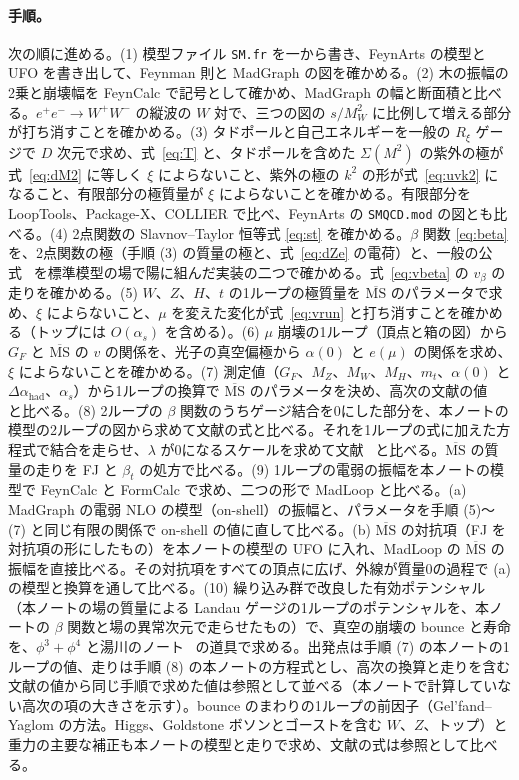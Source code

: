 \documentclass[a4paper,10pt]{ltjsarticle}
\newcommand{\MSbar}{\overline{\mathrm{MS}}}
\begin{document}
\paragraph{手順。}次の順に進める。(1) 模型ファイル \texttt{SM.fr} を一から書き、FeynArts の模型と UFO を書き出して、Feynman 則と MadGraph の図を確かめる。(2) 木の振幅の2乗と崩壊幅を FeynCalc で記号として確かめ、MadGraph の幅と断面積と比べる。$e^+e^-\to W^+W^-$ の縦波の $W$ 対で、三つの図の $s/M_W^2$ に比例して増える部分が打ち消すことを確かめる。(3) タドポールと自己エネルギーを一般の $R_\xi$ ゲージで $D$ 次元で求め、式~\eqref{eq:T} と、タドポールを含めた $\Sigma(M^2)$ の紫外の極が式~\eqref{eq:dM2} に等しく $\xi$ によらないこと、紫外の極の $k^2$ の形が式~\eqref{eq:uvk2} になること、有限部分の極質量が $\xi$ によらないことを確かめる。有限部分を LoopTools、Package-X、COLLIER で比べ、FeynArts の \texttt{SMQCD.mod} の図とも比べる。(4) 2点関数の Slavnov--Taylor 恒等式 \eqref{eq:st} を確かめる。$\beta$ 関数 \eqref{eq:beta} を、2点関数の極（手順 (3) の質量の極と、式~\eqref{eq:dZe} の電荷）と、一般の公式~\cite{mv1,mv2,mv3,luo03} を標準模型の場で陽に組んだ実装の二つで確かめる。式~\eqref{eq:vbeta} の $v_\beta$ の走りを確かめる。(5) $W$、$Z$、$H$、$t$ の1ループの極質量を $\MSbar$ のパラメータで求め、$\xi$ によらないこと、$\mu$ を変えた変化が式~\eqref{eq:vrun} と打ち消すことを確かめる（トップには $O(\alpha_s)$ を含める）。(6) $\mu$ 崩壊の1ループ（頂点と箱の図）から $G_F$ と $\MSbar$ の $v$ の関係を、光子の真空偏極から $\alpha(0)$ と $e(\mu)$ の関係を求め、$\xi$ によらないことを確かめる。(7) 測定値（$G_F$、$M_Z$、$M_W$、$M_H$、$m_t$、$\alpha(0)$ と $\Delta\alpha_{\mathrm{had}}$、$\alpha_s$）から1ループの換算で $\MSbar$ のパラメータを決め、高次の文献の値~\cite{buttazzo13,mr19} と比べる。(8) 2ループの $\beta$ 関数のうちゲージ結合を0にした部分を、本ノートの模型の2ループの図から求めて文献の式と比べる。それを1ループの式に加えた方程式で結合を走らせ、$\lambda$ が0になるスケールを求めて文献~\cite{degrassi12,buttazzo13} と比べる。$\MSbar$ の質量の走りを FJ と $\beta_t$ の処方で比べる。(9) 1ループの電弱の振幅を本ノートの模型で FeynCalc と FormCalc で求め、二つの形で MadLoop と比べる。(a) MadGraph の電弱 NLO の模型（on-shell）の振幅と、パラメータを手順 (5)〜(7) と同じ有限の関係で on-shell の値に直して比べる。(b) $\MSbar$ の対抗項（FJ を対抗項の形にしたもの）を本ノートの模型の UFO に入れ、MadLoop の $\MSbar$ の振幅を直接比べる。その対抗項をすべての頂点に広げ、外線が質量0の過程で (a) の模型と換算を通して比べる。(10) 繰り込み群で改良した有効ポテンシャル（本ノートの場の質量による Landau ゲージの1ループのポテンシャルを、本ノートの $\beta$ 関数と場の異常次元で走らせたもの）で、真空の崩壊の bounce と寿命を、$\phi^3+\phi^4$ と湯川のノート~\cite{phi34note,yukawanote} の道具で求める。出発点は手順 (7) の本ノートの1ループの値、走りは手順 (8) の本ノートの方程式とし、高次の換算と走りを含む文献の値から同じ手順で求めた値は参照として並べる（本ノートで計算していない高次の項の大きさを示す）。bounce のまわりの1ループの前因子（Gel'fand--Yaglom の方法。Higgs、Goldstone ボソンとゴーストを含む $W$、$Z$、トップ）と重力の主要な補正も本ノートの模型と走りで求め、文献の式は参照として比べる。
\end{document}
